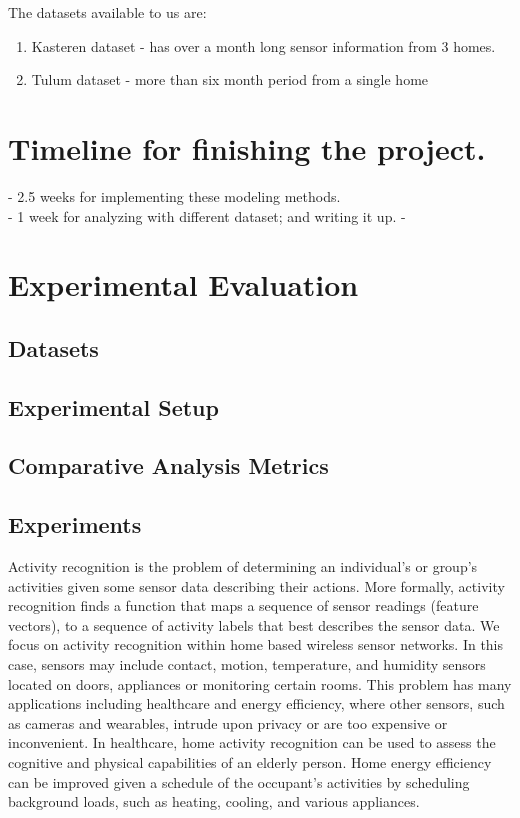 \documentclass[11pt, oneside]{article}   	%
\begin{document}
The datasets available to us are:
	\begin{enumerate}
\item Kasteren dataset - has over a month long sensor information from 3 homes.
\item Tulum dataset - more than six month period from a single home
	\end{enumerate}
\section{ Timeline for finishing the project. }
 - 2.5 weeks for implementing these modeling methods. \\
 - 1 week for analyzing with different dataset; and writing it up. 
 - 

\section{Experimental Evaluation}

\subsection{Datasets}

\subsection{Experimental Setup}

\subsection{Comparative Analysis Metrics}

\subsection{Experiments}

	Activity recognition is the problem of determining an individual's or group's activities given some sensor data describing their actions.
	More formally, activity recognition finds a function that maps a sequence of sensor readings (feature vectors), to a sequence of activity labels that best describes the sensor data.
	We focus on activity recognition within home based wireless sensor networks.
	In this case, sensors may include contact, motion, temperature, and humidity sensors located on doors, appliances or monitoring certain rooms.
	This problem has many applications including healthcare and energy efficiency, where other sensors, such as cameras and wearables, intrude upon privacy or are too expensive or inconvenient.
	In healthcare, home activity recognition can be used to assess the cognitive and physical capabilities of an elderly person.
	Home energy efficiency can be improved given a schedule of the occupant's activities by scheduling background loads, such as heating, cooling, and various appliances.
\end{document}
